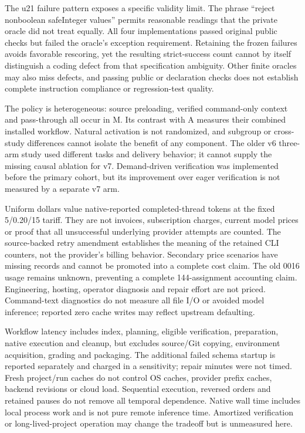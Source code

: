 \documentclass[manuscript,screen,nonacm]{acmart}
\begin{document}
The u21 failure pattern exposes a specific validity limit. The phrase
``reject nonboolean safeInteger values'' permits reasonable readings
that the private oracle did not treat equally. All four implementations
passed original public checks but failed the oracle's exception
requirement. Retaining the frozen failures avoids favorable rescoring,
yet the resulting strict-success count cannot by itself distinguish a
coding defect from that specification ambiguity. Other finite oracles
may also miss defects, and passing public or declaration checks does not
establish complete instruction compliance or regression-test quality.

The policy is heterogeneous: source preloading, verified command-only
context and pass-through all occur in M. Its contrast with A measures
their combined installed workflow. Natural activation is not randomized,
and subgroup or cross-study differences cannot isolate the benefit of
any component. The older v6 three-arm study used different tasks and
delivery behavior; it cannot supply the missing causal ablation for v7.
Demand-driven verification was implemented before the primary cohort,
but its improvement over eager verification is not measured by a
separate v7 arm.

Uniform dollars value native-reported completed-thread tokens at the
fixed 5/0.20/15 tariff. They are not invoices, subscription charges,
current model prices or proof that all unsuccessful underlying provider
attempts are counted. The source-backed retry amendment establishes the
meaning of the retained CLI counters, not the provider's billing
behavior. Secondary price scenarios have missing records and cannot be
promoted into a complete cost claim. The old 0016 usage remains unknown,
preventing a complete 144-assignment accounting claim. Engineering,
hosting, operator diagnosis and repair effort are not priced.
Command-text diagnostics do not measure all file I/O or avoided model
inference; reported zero cache writes may reflect upstream defaulting.

Workflow latency includes index, planning, eligible verification,
preparation, native execution and cleanup, but excludes source/Git
copying, environment acquisition, grading and packaging. The additional
failed schema startup is reported separately and charged in a
sensitivity; repair minutes were not timed. Fresh project/run caches do
not control OS caches, provider prefix caches, backend revisions or
cloud load. Sequential execution, reversed orders and retained pauses do
not remove all temporal dependence. Native wall time includes local
process work and is not pure remote inference time. Amortized
verification or long-lived-project operation may change the tradeoff but
is unmeasured here.
\end{document}
